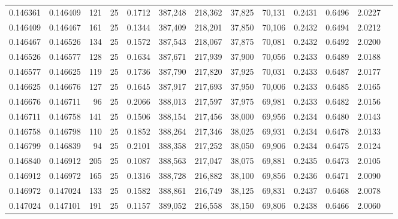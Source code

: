 \begin{tabular}{rrrrrrrrrrrrr}
0.146361 & 0.146409 &   121 &  25 &                                     0.1712 & 387,248 & 218,362 &  37,825 &  70,131 & 0.2431 & 0.6496 & 2.0227 \\
0.146409 & 0.146467 &   161 &  25 &                                     0.1344 & 387,409 & 218,201 &  37,850 &  70,106 & 0.2432 & 0.6494 & 2.0212 \\
0.146467 & 0.146526 &   134 &  25 &                                     0.1572 & 387,543 & 218,067 &  37,875 &  70,081 & 0.2432 & 0.6492 & 2.0200 \\
0.146526 & 0.146577 &   128 &  25 &                                     0.1634 & 387,671 & 217,939 &  37,900 &  70,056 & 0.2433 & 0.6489 & 2.0188 \\
0.146577 & 0.146625 &   119 &  25 &                                     0.1736 & 387,790 & 217,820 &  37,925 &  70,031 & 0.2433 & 0.6487 & 2.0177 \\
0.146625 & 0.146676 &   127 &  25 &                                     0.1645 & 387,917 & 217,693 &  37,950 &  70,006 & 0.2433 & 0.6485 & 2.0165 \\
0.146676 & 0.146711 &    96 &  25 &                                     0.2066 & 388,013 & 217,597 &  37,975 &  69,981 & 0.2433 & 0.6482 & 2.0156 \\
0.146711 & 0.146758 &   141 &  25 &                                     0.1506 & 388,154 & 217,456 &  38,000 &  69,956 & 0.2434 & 0.6480 & 2.0143 \\
0.146758 & 0.146798 &   110 &  25 &                                     0.1852 & 388,264 & 217,346 &  38,025 &  69,931 & 0.2434 & 0.6478 & 2.0133 \\
0.146799 & 0.146839 &    94 &  25 &                                     0.2101 & 388,358 & 217,252 &  38,050 &  69,906 & 0.2434 & 0.6475 & 2.0124 \\
0.146840 & 0.146912 &   205 &  25 &                                     0.1087 & 388,563 & 217,047 &  38,075 &  69,881 & 0.2435 & 0.6473 & 2.0105 \\
0.146912 & 0.146972 &   165 &  25 &                                     0.1316 & 388,728 & 216,882 &  38,100 &  69,856 & 0.2436 & 0.6471 & 2.0090 \\
0.146972 & 0.147024 &   133 &  25 &                                     0.1582 & 388,861 & 216,749 &  38,125 &  69,831 & 0.2437 & 0.6468 & 2.0078 \\
0.147024 & 0.147101 &   191 &  25 &                                     0.1157 & 389,052 & 216,558 &  38,150 &  69,806 & 0.2438 & 0.6466 & 2.0060 \\

\end{tabular}
